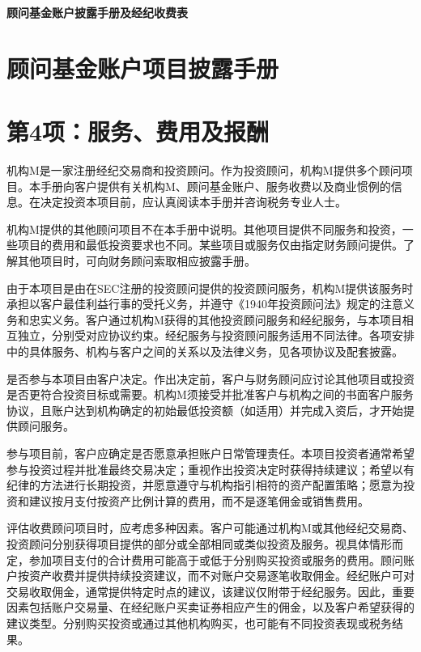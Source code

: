 \documentclass[UTF8,fontset=none,11pt,a4paper]{ctexart}
\begin{document}
{\noindent\LARGE\bfseries 顾问基金账户披露手册及经纪收费表\par}
\vspace{10pt}
\section*{顾问基金账户项目披露手册}
\section*{第4项：服务、费用及报酬}
机构M是一家注册经纪交易商和投资顾问。作为投资顾问，机构M提供多个顾问项目。本手册向客户提供有关机构M、顾问基金账户、服务收费以及商业惯例的信息。在决定投资本项目前，应认真阅读本手册并咨询税务专业人士。


机构M提供的其他顾问项目不在本手册中说明。其他项目提供不同服务和投资，一些项目的费用和最低投资要求也不同。某些项目或服务仅由指定财务顾问提供。了解其他项目时，可向财务顾问索取相应披露手册。


由于本项目是由在SEC注册的投资顾问提供的投资顾问服务，机构M提供该服务时承担以客户最佳利益行事的受托义务，并遵守《1940年投资顾问法》规定的注意义务和忠实义务。客户通过机构M获得的其他投资顾问服务和经纪服务，与本项目相互独立，分别受对应协议约束。经纪服务与投资顾问服务适用不同法律。各项安排中的具体服务、机构与客户之间的关系以及法律义务，见各项协议及配套披露。


是否参与本项目由客户决定。作出决定前，客户与财务顾问应讨论其他项目或投资是否更符合投资目标或需要。机构M须接受并批准客户与机构之间的书面客户服务协议，且账户达到机构确定的初始最低投资额（如适用）并完成入资后，才开始提供顾问服务。


参与项目前，客户应确定是否愿意承担账户日常管理责任。本项目投资者通常希望参与投资过程并批准最终交易决定；重视作出投资决定时获得持续建议；希望以有纪律的方法进行长期投资，并愿意遵守与机构指引相符的资产配置策略；愿意为投资和建议按月支付按资产比例计算的费用，而不是逐笔佣金或销售费用。


评估收费顾问项目时，应考虑多种因素。客户可能通过机构M或其他经纪交易商、投资顾问分别获得项目提供的部分或全部相同或类似投资及服务。视具体情形而定，参加项目支付的合计费用可能高于或低于分别购买投资或服务的费用。顾问账户按资产收费并提供持续投资建议，而不对账户交易逐笔收取佣金。经纪账户可对交易收取佣金，通常提供特定时点的建议，该建议仅附带于经纪服务。因此，重要因素包括账户交易量、在经纪账户买卖证券相应产生的佣金，以及客户希望获得的建议类型。分别购买投资或通过其他机构购买，也可能有不同投资表现或税务结果。
\end{document}
